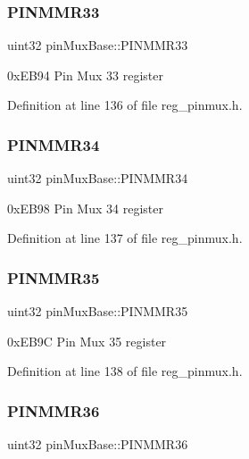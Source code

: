 \subsubsection{\texorpdfstring{P\+I\+N\+M\+M\+R33}{PINMMR33}}
{\footnotesize\ttfamily uint32 pin\+Mux\+Base\+::\+P\+I\+N\+M\+M\+R33}

0x\+E\+B94 Pin Mux 33 register 

Definition at line 136 of file reg\+\_\+pinmux.\+h.

\mbox{\label{structpinMuxBase_af8f676ba34c9cecece1c150aa07aa110}} 
\subsubsection{\texorpdfstring{P\+I\+N\+M\+M\+R34}{PINMMR34}}
{\footnotesize\ttfamily uint32 pin\+Mux\+Base\+::\+P\+I\+N\+M\+M\+R34}

0x\+E\+B98 Pin Mux 34 register 

Definition at line 137 of file reg\+\_\+pinmux.\+h.

\mbox{\label{structpinMuxBase_ae7f016592bf9320e2ed29c79c144d285}} 
\subsubsection{\texorpdfstring{P\+I\+N\+M\+M\+R35}{PINMMR35}}
{\footnotesize\ttfamily uint32 pin\+Mux\+Base\+::\+P\+I\+N\+M\+M\+R35}

0x\+E\+B9C Pin Mux 35 register 

Definition at line 138 of file reg\+\_\+pinmux.\+h.

\mbox{\label{structpinMuxBase_a86cf3592391fe6d66f4d8f76ffdda28d}} 
\subsubsection{\texorpdfstring{P\+I\+N\+M\+M\+R36}{PINMMR36}}
{\footnotesize\ttfamily uint32 pin\+Mux\+Base\+::\+P\+I\+N\+M\+M\+R36}

